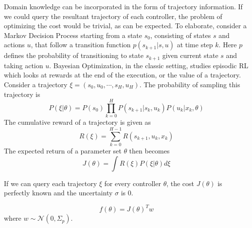 Domain knowledge can be incorporated in the form of trajectory information. If we could query the resultant trajectory of each controller, the problem of optimizing the cost would be trivial, as can be expected. To elaborate, consider a Markov Decision Process starting from a state $s_0$, consisting of states $s$ and actions $u$, that follow a transition function $p(s_{k+1}|s,u)$ at time step $k$. Here $p$ defines the probability of transitioning to state $s_{k+1}$ given current state $s$ and taking action $u$. %
Bayesian Optimization, in the classic setting, studies episodic RL which looks at rewards at the end of the execution, or the value of a trajectory. Consider a trajectory $\xi = (s_0, u_0, \cdots , s_H, u_H)$. The probability of sampling this trajectory is
\begin{equation}
    P(\xi|\theta) = P(s_0) \prod_{k=0}^H P(s_{k+1}|s_k,u_k)P(u_k|x_k,\theta)
\end{equation}
The cumulative reward of a trajectory is given as
\begin{equation}
    R(\xi) = \sum_{k=0}^{H-1} R(s_{k+1}, u_{k}, x_{k})
\end{equation}
The expected return of a parameter set $\theta$ then becomes 
\begin{equation}
    J(\theta) = \int R(\xi) P(\xi|\theta) d\xi
\end{equation}

If we can query each trajectory $\xi$ for every controller $\theta$, the cost $J(\theta)$ is perfectly known and the uncertainty $\sigma$ is 0.

\begin{equation}
    f(\theta) = J(\theta)^Tw
\end{equation}
where $w \sim \mathcal{N}(0, \Sigma_p)$.

